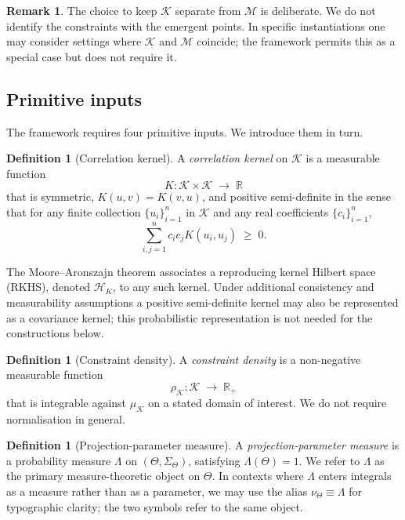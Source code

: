 ﻿\documentclass[12pt,a4paper]{article}
\theoremstyle{definition}
\newtheorem{definition}[theorem]{Definition}
\newtheorem{remark}[theorem]{Remark}
\begin{document}
\begin{remark}
The choice to keep $\mathcal{K}$ separate from $\mathcal{M}$ is deliberate. We do not identify the constraints with the emergent points. In specific instantiations one may consider settings where $\mathcal{K}$ and $\mathcal{M}$ coincide; the framework permits this as a special case but does not require it.
\end{remark}

\subsection{Primitive inputs}
\label{sec:primitive_inputs}

The framework requires four primitive inputs. We introduce them in turn.

\begin{definition}[Correlation kernel]
A \emph{correlation kernel} on $\mathcal{K}$ is a measurable function
\[
K : \mathcal{K} \times \mathcal{K} \;\longrightarrow\; \mathbb{R}
\]
that is symmetric, $K(u,v) = K(v,u)$, and positive semi-definite in the sense that for any finite collection $\{u_i\}_{i=1}^n$ in $\mathcal{K}$ and any real coefficients $\{c_i\}_{i=1}^n$,
\[
\sum_{i,j=1}^n c_i c_j K(u_i,u_j) \;\geq\; 0.
\]
\end{definition}

The Moore--Aronszajn theorem associates a reproducing kernel Hilbert space (RKHS), denoted $\mathcal{H}_K$, to any such kernel. Under additional consistency and measurability assumptions a positive semi-definite kernel may also be represented as a covariance kernel; this probabilistic representation is not needed for the constructions below.

\begin{definition}[Constraint density]
A \emph{constraint density} is a non-negative measurable function
\[
\rho_{\mathcal{K}} : \mathcal{K} \;\longrightarrow\; \mathbb{R}_+
\]
that is integrable against $\mu_{\mathcal{K}}$ on a stated domain of interest. We do not require normalisation in general.
\end{definition}

\begin{definition}[Projection-parameter measure]
A \emph{projection-parameter measure} is a probability measure $\Lambda$ on $(\Theta,\Sigma_\Theta)$, satisfying $\Lambda(\Theta) = 1$. We refer to $\Lambda$ as the primary measure-theoretic object on $\Theta$. In contexts where $\Lambda$ enters integrals as a measure rather than as a parameter, we may use the alias $\nu_\Theta \equiv \Lambda$ for typographic clarity; the two symbols refer to the same object.
\end{definition}
\end{document}
